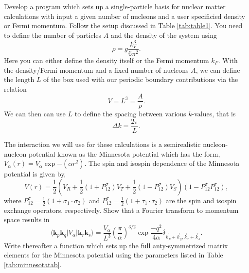   \begin{prob}\label{problem:spbasissetup}
  Develop a program which sets up a single-particle basis for nuclear
  matter calculations with input a given number of nucleons and a user
  specificied density or Fermi momentum. Follow the setup discussed in
  Table \ref{tab:table1}.  You need to define the number of particles
  $A$ and the density of the system using
  \[
  \rho = g \frac{k_F^3}{6\pi^2}.
  \]
  Here you can either define the density itself or the Fermi momentum
  $k_F$.  With the density/Fermi momentum and a fixed number of
  nucleons $A$, we can define the length $L$ of the box used with our
  periodic boundary contributions via the relation
  \[
    V= L^3= \frac{A}{\rho}.
  \]
  We can then can use $L$ to define the spacing between various
  $k$-values, that is
  \[
    \Delta k = \frac{2\pi}{L}.
  \]
  \end{prob}


  \begin{prob}\label{problem:fourier}
  The interaction we will use for these calculations is a
  semirealistic nucleon-nucleon potential known as the Minnesota
  potential \cite{minnesota} which has the form, $V_{\alpha}\left(
  r\right)=V_{\alpha}\exp{-(\alpha r^{2})}$. The spin and isospin
  dependence of the Minnesota potential is given by,
  \[
  V\left( r\right)=\frac{1}{2}\left( V_{R}+\frac{1}{2}\left(
  1+P_{12}^{\sigma}\right) V_{T}+\frac{1}{2}\left(
  1-P_{12}^{\sigma}\right) V_{S}\right)\left(
  1-P_{12}^{\sigma}P_{12}^{\tau}\right),
  \]
  where $P_{12}^{\sigma}=\frac{1}{2}\left(
  1+\sigma_{1}\cdot\sigma_{2}\right)$ and
  $P_{12}^{\tau}=\frac{1}{2}\left( 1+\tau_{1}\cdot\tau_{2}\right)$ are
  the spin and isospin exchange operators, respectively.  Show that a
  Fourier transform to momentum space results in
  \[
  \langle \mathbf{k}_p \mathbf{k}_q \vert V_{\alpha}\vert
  \mathbf{k}_r\mathbf{k}_s\rangle=\frac{V_{\alpha}}{L^{3}}\left(\frac{\pi}{\alpha}\right)^{3/2}\exp{\frac{-q^{2}}{4\alpha}}\delta_{\vec{k}_{p}+\vec{k}_{q},\vec{k}_{r}+\vec{k}_{s}}.
  \]
  Write thereafter a function which sets up the full anty-symmetrized
  matrix elements for the Minnesota potential using the parameters
  listed in Table \ref{tab:minnesotatab}.
  \end{prob}



